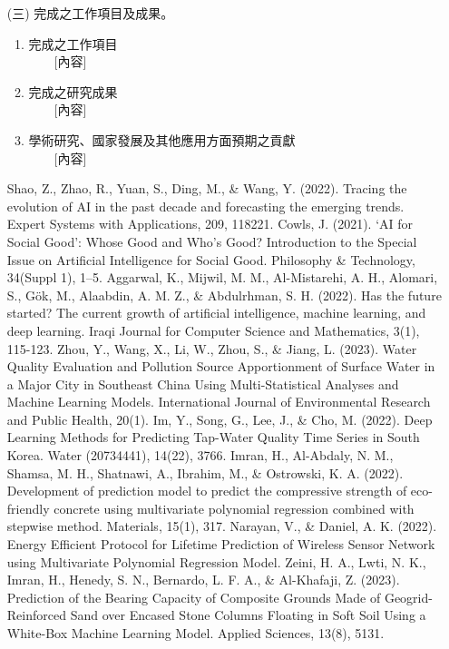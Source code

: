 \documentclass[12pt,a4paper]{article}
\begin{document}
\begin{enumerate}
\item[(三)] 完成之工作項目及成果。
\begin{enumerate}[label=\arabic*.]
\item 完成之工作項目\\
　　[內容]
\item 完成之研究成果\\
　　[內容]
\item 學術研究、國家發展及其他應用方面預期之貢獻\\
　　[內容]
\end{enumerate}

\begin{thebibliography}{99}
 Shao, Z., Zhao, R., Yuan, S., Ding, M., \& Wang, Y. (2022). Tracing the evolution of AI in the past decade and forecasting the emerging trends. Expert Systems with Applications, 209, 118221.
 Cowls, J. (2021). ‘AI for Social Good’: Whose Good and Who’s Good? Introduction to the Special Issue on Artificial Intelligence for Social Good. Philosophy \& Technology, 34(Suppl 1), 1–5. 
 Aggarwal, K., Mijwil, M. M., Al-Mistarehi, A. H., Alomari, S., Gök, M., Alaabdin, A. M. Z., \& Abdulrhman, S. H. (2022). Has the future started? The current growth of artificial intelligence, machine learning, and deep learning. Iraqi Journal for Computer Science and Mathematics, 3(1), 115-123.
 Zhou, Y., Wang, X., Li, W., Zhou, S., \& Jiang, L. (2023). Water Quality Evaluation and Pollution Source Apportionment of Surface Water in a Major City in Southeast China Using Multi-Statistical Analyses and Machine Learning Models. International Journal of Environmental Research and Public Health, 20(1). 
 Im, Y., Song, G., Lee, J., \& Cho, M. (2022). Deep Learning Methods for Predicting Tap-Water Quality Time Series in South Korea. Water (20734441), 14(22), 3766. 
 Imran, H., Al-Abdaly, N. M., Shamsa, M. H., Shatnawi, A., Ibrahim, M., \& Ostrowski, K. A. (2022). Development of prediction model to predict the compressive strength of eco-friendly concrete using multivariate polynomial regression combined with stepwise method. Materials, 15(1), 317.
 Narayan, V., \& Daniel, A. K. (2022). Energy Efficient Protocol for Lifetime Prediction of Wireless Sensor Network using Multivariate Polynomial Regression Model.
 Zeini, H. A., Lwti, N. K., Imran, H., Henedy, S. N., Bernardo, L. F. A., \& Al-Khafaji, Z. (2023). Prediction of the Bearing Capacity of Composite Grounds Made of Geogrid-Reinforced Sand over Encased Stone Columns Floating in Soft Soil Using a White-Box Machine Learning Model. Applied Sciences, 13(8), 5131.

\end{thebibliography}
\end{enumerate}
\end{document}
